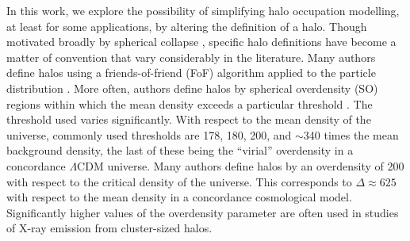 \documentclass[usenatbib,fleqn]{mnras}
\begin{document}
In this work, we explore the possibility of simplifying halo occupation modelling, at least for some 
applications, by altering the definition of a halo.  Though motivated broadly by spherical collapse \citep{gunn_gott72, fillmore_goldreich84, ryden_gunn87, lacey_cole93, eke_etal96, mota_vandebruck04, pace_etal10}, specific halo definitions have become a matter of convention that vary considerably in the literature. Many authors define halos using a friends-of-friend (FoF) algorithm applied to the particle distribution \citep{davis_etal85, knebe_etal11}. More often, authors define halos by spherical overdensity (SO) regions within which the mean density exceeds a particular threshold \citep{knebe_etal11}.  The threshold used varies significantly. With respect to the mean density of the universe, commonly used thresholds are 178, 180, 200, and $\sim$340 times the mean background density, the last of these being the ``virial'' overdensity in a concordance $\Lambda$CDM universe. Many authors define halos by an overdensity of 200 with respect to the critical density of the universe. This corresponds to $\Delta \approx 625$ with respect to the mean density in a concordance cosmological model. Significantly higher values of the overdensity parameter are often used in studies of X-ray emission from cluster-sized halos.
\end{document}
